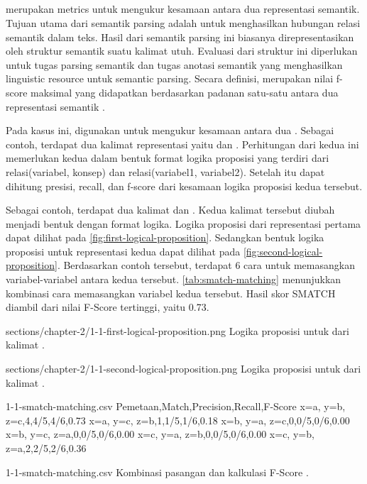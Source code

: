 \subsection{}

\SMATCH{} merupakan metrics untuk mengukur kesamaan antara dua representasi semantik.
Tujuan utama dari semantik parsing adalah untuk menghasilkan hubungan relasi semantik dalam teks.
Hasil dari semantik parsing ini biasanya direpresentasikan oleh struktur semantik suatu kalimat utuh.
Evaluasi dari struktur ini diperlukan untuk tugas parsing semantik dan tugas anotasi semantik yang menghasilkan linguistic resource untuk semantic parsing.
Secara definisi, \SMATCH{} merupakan nilai f-score maksimal yang didapatkan berdasarkan padanan satu-satu antara dua representasi semantik .

Pada kasus ini, \SMATCH{} digunakan untuk mengukur kesamaan antara dua \AMR{}.
Sebagai contoh, terdapat dua kalimat representasi \AMR{} yaitu  dan .
Perhitungan \SMATCH{} dari kedua \AMR{} ini memerlukan kedua \AMR{} dalam bentuk format logika proposisi yang terdiri dari relasi(variabel, konsep) dan relasi(variabel1, variabel2).
Setelah itu dapat dihitung presisi, recall, dan f-score dari kesamaan logika proposisi kedua \AMR{} tersebut.

Sebagai contoh, terdapat dua kalimat  dan .
Kedua kalimat tersebut diubah menjadi bentuk \AMR{} dengan format logika.
Logika proposisi dari representasi \AMR{} pertama dapat dilihat pada \cref{fig:first-logical-proposition}.
Sedangkan bentuk logika proposisi untuk representasi kedua dapat dilihat pada \cref{fig:second-logical-proposition}.
Berdasarkan contoh tersebut, terdapat 6 cara untuk memasangkan variabel-variabel antara kedua \AMR{} tersebut.
\cref{tab:smatch-matching} menunjukkan kombinasi cara memasangkan variabel kedua \AMR{} tersebut.
Hasil skor SMATCH diambil dari nilai F-Score tertinggi, yaitu 0.73.

  {sections/chapter-2/1-1-first-logical-proposition.png}
  {Logika proposisi untuk \AMR{} dari kalimat .}

  {sections/chapter-2/1-1-second-logical-proposition.png}
  {Logika proposisi untuk \AMR{} dari kalimat .}

\begin{filecontents*}{1-1-smatch-matching.csv}
Pemetaan,Match,Precision,Recall,F-Score
{x=a, y=b, z=c},4,4/5,4/6,0.73
{x=a, y=c, z=b},1,1/5,1/6,0.18
{x=b, y=a, z=c},0,0/5,0/6,0.00
{x=b, y=c, z=a},0,0/5,0/6,0.00
{x=c, y=a, z=b},0,0/5,0/6,0.00
{x=c, y=b, z=a},2,2/5,2/6,0.36
\end{filecontents*}
  {1-1-smatch-matching.csv}
  {Kombinasi pasangan \AMR{} dan kalkulasi F-Score .}

